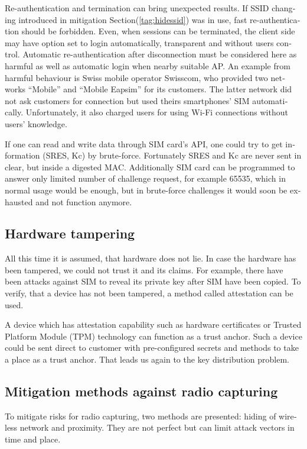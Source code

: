 \documentclass[12pt,a4paper,english]{tutthesis}
\begin{document}
\begin{otherlanguage}{english}
{Re-authentication and termination can bring unexpected results.
If SSID changing introduced in mitigation Section(\ref{tag:hidessid}) was in use, fast re-authentication
should be forbidden\cite[p.11]{rfc5448}.
Even, when sessions can be terminated, the client side may have 
option set to login automatically, transparent and without users control.
Automatic re-authentication after disconnection  must be considered
here as harmful as well as automatic login when nearby suitable AP. An
example from harmful behaviour is Swiss mobile operator Swisscom, who
 provided two networks ``Mobile'' and ``Mobile Eapsim''  for its
customers. 
The latter network did not ask customers
for connection but used theirs smartphones' SIM automatically. Unfortunately,
it also charged users for using Wi-Fi connections without users'
knowledge.\cite{swisscom}



If one can read and write data through SIM card's API,
one could try to get information (SRES, Kc) by brute-force. 
Fortunately SRES and Kc are never sent in clear, but inside
a digested MAC.
 Additionally SIM card can be programmed to answer only
limited number of challenge request, for example 65535, which in
normal usage would be enough, but in brute-force challenges 
it would soon be exhausted and not function anymore.


\subsection{Hardware tampering}
\label{sec-6-4-6}
All this time it is assumed, that hardware does not lie. In case
the hardware has been tampered, we could not trust it and its claims.
For example, there have been attacks against SIM to reveal its private
key after SIM have been copied.  To verify, that a device has not been
tampered, a method called attestation can be used.

A device which has attestation capability such as 
hardware certificates or Trusted Platform Module (TPM) technology
can function as a trust anchor.
Such a device could be sent direct to customer with pre-configured
secrets and methods to take a place as a trust anchor. 
That leads us again to the key distribution problem.


\subsection{Mitigation methods against radio capturing}
\label{sec-6-4-7}
To mitigate risks for radio capturing, two methods are presented: hiding of
wireless network and proximity. They are not perfect but can
limit attack vectors in time and place.


}
\end{otherlanguage}
\end{document}

